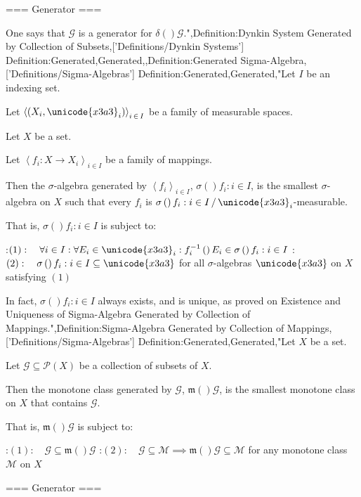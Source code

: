 === Generator ===

One says that $\mathcal G$ is a generator for $\delta \left(   \right)\mathcal G$.",Definition:Dynkin System Generated by Collection of Subsets,['Definitions/Dynkin Systems']
Definition:Generated,Generated,,Definition:Generated Sigma-Algebra,['Definitions/Sigma-Algebras']
Definition:Generated,Generated,"Let $I$ be an indexing set.

Let $\left\langle \left( X_i, \unicode{x3a3}_i \right)  \right\rangle_{i \mathop \in I}$ be a family of measurable spaces.

Let $X$ be a set.

Let $\left\langle f_i: X \to X_i \right\rangle_{i \mathop \in I}$ be a family of mappings.


Then the $\sigma$-algebra generated by $\left\langle f_i \right\rangle_{i \mathop \in I}$, $\sigma \left(   \right){f_i: i \in I}$, is the smallest $\sigma$-algebra on $X$ such that every $f_i$ is $\sigma \left(   \right){f_i: i \in I} \, / \, \unicode{x3a3}_i$-measurable.

That is, $\sigma \left(   \right){f_i: i \in I}$ is subject to:

:$(1):\quad \forall i \in I: \forall E_i \in \unicode{x3a3}_i: f_i^{-1}  \left(   \right){E_i} \in \sigma \left(   \right){f_i: i \in I}$
:$(2):\quad \sigma \left(   \right){f_i: i \in I} \subseteq \unicode{x3a3}$ for all $\sigma$-algebras $\unicode{x3a3}$ on $X$ satisfying $(1)$


In fact, $\sigma \left(   \right){f_i: i \in I}$ always exists, and is unique, as proved on Existence and Uniqueness of Sigma-Algebra Generated by Collection of Mappings.",Definition:Sigma-Algebra Generated by Collection of Mappings,['Definitions/Sigma-Algebras']
Definition:Generated,Generated,"Let $X$ be a set.

Let $\mathcal G \subseteq \mathcal P \left( X \right)$ be a collection of subsets of $X$.


Then the monotone class generated by $\mathcal G$, $\mathfrak m \left(   \right)\mathcal G$, is the smallest monotone class on $X$ that contains $\mathcal G$.

That is, $\mathfrak m \left(   \right)\mathcal G$ is subject to:

:$(1): \quad \mathcal G \subseteq \mathfrak m \left(   \right)\mathcal G$
:$(2): \quad \mathcal G \subseteq \mathcal M \implies \mathfrak m \left(   \right)\mathcal G \subseteq \mathcal M$ for any monotone class $\mathcal M$ on $X$


=== Generator ===

